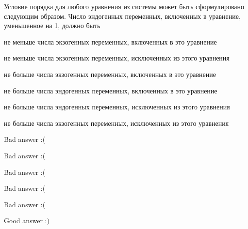 
\begin{question}
Условие порядка для любого уравнения из системы может быть сформулировано следующим образом.
Число эндогенных переменных, включенных в уравнение, уменьшенное на 1, должно быть
\begin{answerlist}
  \item не меньше числа экзогенных переменных, включенных в это уравнение
  \item не меньше числа экзогенных переменных, исключенных из этого уравнения
  \item не больше числа экзогенных переменных, включенных в это уравнение
  \item не больше числа эндогенных переменных, включенных в это уравнение
  \item не больше числа эндогенных переменных, исключенных из этого уравнения
  \item не больше числа экзогенных переменных, исключенных из этого уравнения
\end{answerlist}
\end{question}

\begin{solution}
\begin{answerlist}
  \item Bad answer :(
  \item Bad answer :(
  \item Bad answer :(
  \item Bad answer :(
  \item Bad answer :(
  \item Good answer :)
\end{answerlist}
\end{solution}

